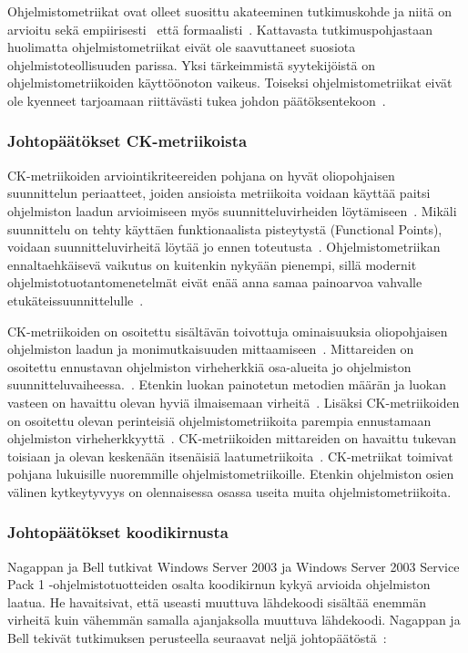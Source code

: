\documentclass[finnish]{tktltiki2}
\theoremstyle{definition}
\theoremstyle{remark}
\begin{document}
Ohjelmistometriikat ovat olleet suosittu akateeminen tutkimuskohde ja niitä on arvioitu sekä empiirisesti~\cite{SK03, BBM96} että formaalisti~\cite{W88}. Kattavasta tutkimuspohjastaan huolimatta ohjelmistometriikat eivät ole saavuttaneet suosiota ohjelmistoteollisuuden parissa. Yksi tärkeimmistä syytekijöistä on ohjelmistometriikoiden käyttöönoton vaikeus. Toiseksi ohjelmistometriikat eivät ole kyenneet tarjoamaan riittävästi tukea johdon päätöksentekoon~\cite{FM00}.

\subsubsection{Johtopäätökset CK-metriikoista}

CK-metriikoiden arviointikriteereiden pohjana on hyvät oliopohjaisen suunnittelun periaatteet, joiden ansioista metriikoita voidaan käyttää paitsi ohjelmiston laadun arvioimiseen myös suunnitteluvirheiden löytämiseen~\cite{CK94}. Mikäli suunnittelu on tehty käyttäen funktionaalista pisteytystä (Functional Points), voidaan suunnitteluvirheitä löytää jo ennen toteutusta~\cite{A79, CK94}. Ohjelmistometriikan ennaltaehkäisevä vaikutus on kuitenkin nykyään pienempi, sillä modernit ohjelmistotuotantomenetelmät eivät enää anna samaa painoarvoa vahvalle etukäteissuunnittelulle~\cite{BBB00}.

CK-metriikoiden on osoitettu sisältävän toivottuja ominaisuuksia oliopohjaisen ohjelmiston laadun ja monimutkaisuuden mittaamiseen~\cite{GFS05}. Mittareiden on osoitettu ennustavan ohjelmiston virheherkkiä osa-alueita jo ohjelmiston suunnitteluvaiheessa.~\cite{CK94, BBM96, SK03}. Etenkin luokan painotetun metodien määrän ja luokan vasteen on havaittu olevan hyviä ilmaisemaan virheitä~\cite{TKC99, OEGQ07}. Lisäksi CK-metriikoiden on osoitettu olevan perinteisiä ohjelmistometriikoita parempia ennustamaan ohjelmiston virheherkkyyttä~\cite{BBM96}. CK-metriikoiden mittareiden on havaittu tukevan toisiaan ja olevan keskenään itsenäisiä laatumetriikoita~\cite{BBM96}. CK-metriikat toimivat pohjana lukuisille nuoremmille ohjelmistometriikoille. Etenkin ohjelmiston osien välinen kytkeytyvyys on olennaisessa osassa useita muita ohjelmistometriikoita.

\subsubsection{Johtopäätökset koodikirnusta}

Nagappan ja Bell tutkivat Windows Server 2003 ja Windows Server 2003 Service Pack 1 -ohjelmistotuotteiden osalta koodikirnun kykyä arvioida ohjelmiston laatua. He havaitsivat, että useasti muuttuva lähdekoodi sisältää enemmän virheitä kuin vähemmän samalla ajanjaksolla muuttuva lähdekoodi. Nagappan ja Bell tekivät tutkimuksen perusteella seuraavat neljä johtopäätöstä~\cite{NB05}:
\end{document}
